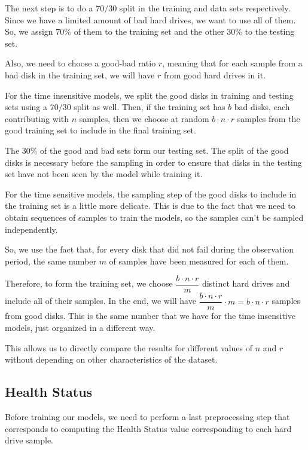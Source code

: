 The next step is to do a $70/30$ split in the training and data sets respectively.
Since we have a limited amount of bad hard drives, we want to use all of them.
So, we assign $70\%$ of them to the training set and the other $30\%$ to the testing set.

Also, we need to choose a good-bad ratio $r$, meaning that for each sample from a bad disk in the training set, we will have $r$ from good hard drives in it.

For the time insensitive models, we split the good disks in training and testing sets using a $70/30$ split as well.
Then, if the training set has $b$ bad disks, each contributing with $n$ samples, then we choose at random $b\cdot n \cdot r$ samples from the good training set to include in the final training set.

The $30\%$ of the good and bad sets form our testing set.
The split of the good disks is necessary before the sampling in order to ensure that disks in the testing set have not been seen by the model while training it.

For the time sensitive models, the sampling step of the good disks to include in the training set is a little more delicate.
This is due to the fact that we need to obtain sequences of samples to train the models, so the samples can't be sampled independently.

So, we use the fact that, for every disk that did not fail during the observation period, the same number $m$ of samples have been measured for each of them.

Therefore, to form the training set, we choose $\dfrac{b\cdot n \cdot r}{m}$ distinct hard drives and include all of their samples.
In the end, we will have $\dfrac{b\cdot n \cdot r}{m} \cdot m = b\cdot n \cdot r$ samples from good disks.
This is the same number that we have for the time insensitive models, just organized in a different way.

This allows us to directly compare the results for different values of $n$ and $r$ without depending on other characteristics of the dataset.

\subsection{Health Status}\label{subsec:health_status}

Before training our models, we need to perform a last preprocessing step that corresponds to computing the Health Status value corresponding to each hard drive sample.

